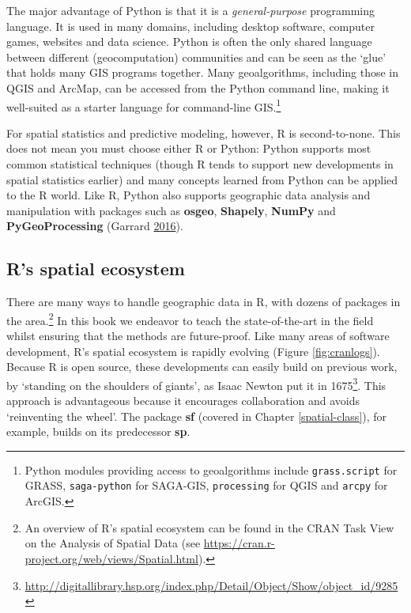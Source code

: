 \documentclass[]{krantz}
\let\rmarkdownfootnote\footnote%
\def\footnote{\protect\rmarkdownfootnote}
\renewcommand{\href}[2]{#2\footnote{\url{#1}}}
\begin{document}
The major advantage of Python is that it is a \emph{general-purpose} programming language.
It is used in many domains, including desktop software, computer games, websites and data science.
Python is often the only shared language between different (geocomputation) communities and can be seen as the `glue' that holds many GIS programs together.
Many geoalgorithms, including those in QGIS and ArcMap, can be accessed from the Python command line, making it well-suited as a starter language for command-line GIS.\footnote{Python modules providing access to geoalgorithms include \texttt{grass.script} for GRASS,
  \texttt{saga-python} for SAGA-GIS,
  \texttt{processing} for QGIS and \texttt{arcpy} for ArcGIS.}

For spatial statistics and predictive modeling, however, R is second-to-none.
This does not mean you must choose either R or Python: Python supports most common statistical techniques (though R tends to support new developments in spatial statistics earlier) and many concepts learned from Python can be applied to the R world.
Like R, Python also supports geographic data analysis and manipulation with packages such as \textbf{osgeo}, \textbf{Shapely}, \textbf{NumPy} and \textbf{PyGeoProcessing} (Garrard \protect\hyperlink{ref-garrard_geoprocessing_2016}{2016}).

\hypertarget{rs-spatial-ecosystem}{%
\subsection{R's spatial ecosystem}\label{rs-spatial-ecosystem}}

There are many ways to handle geographic data in R, with dozens of packages in the area.\footnote{An overview of R's spatial ecosystem can be found in the CRAN Task View on the Analysis of Spatial Data
  (see \url{https://cran.r-project.org/web/views/Spatial.html}).}
In this book we endeavor to teach the state-of-the-art in the field whilst ensuring that the methods are future-proof.
Like many areas of software development, R's spatial ecosystem is rapidly evolving (Figure \ref{fig:cranlogs}).
Because R is open source, these developments can easily build on previous work, by `standing on the shoulders of giants', as Isaac Newton put it in \href{http://digitallibrary.hsp.org/index.php/Detail/Object/Show/object_id/9285}{1675}.
This approach is advantageous because it encourages collaboration and avoids `reinventing the wheel'.
The package \textbf{sf} (covered in Chapter \ref{spatial-class}), for example, builds on its predecessor \textbf{sp}.
\end{document}
